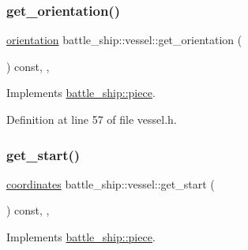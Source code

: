 \mbox{\label{classbattle__ship_1_1vessel_a698c7811878e56b7ba7eb6d88e6ac13f}} 
\subsubsection{\texorpdfstring{get\+\_\+orientation()}{get\_orientation()}}
{\footnotesize\ttfamily \hyperlink{namespacebattle__ship_aed87488f0a73f0d0679fe343fb61c784}{orientation} battle\+\_\+ship\+::vessel\+::get\+\_\+orientation (\begin{DoxyParamCaption}{ }\end{DoxyParamCaption}) const\hspace{0.3cm}{\ttfamily [inline]}, {\ttfamily [override]}, {\ttfamily [virtual]}}



Implements \hyperlink{classbattle__ship_1_1piece_a2cc01b1ec66bfb91df048401233e9618}{battle\+\_\+ship\+::piece}.



Definition at line 57 of file vessel.\+h.

\mbox{\label{classbattle__ship_1_1vessel_aba133e1debe50caa9cbbae5e867b5995}} 
\subsubsection{\texorpdfstring{get\+\_\+start()}{get\_start()}}
{\footnotesize\ttfamily \hyperlink{structbattle__ship_1_1coordinates}{coordinates} battle\+\_\+ship\+::vessel\+::get\+\_\+start (\begin{DoxyParamCaption}{ }\end{DoxyParamCaption}) const\hspace{0.3cm}{\ttfamily [inline]}, {\ttfamily [override]}, {\ttfamily [virtual]}}



Implements \hyperlink{classbattle__ship_1_1piece_ab5010cea30b96f5afc758b2a9d0d43bc}{battle\+\_\+ship\+::piece}.




